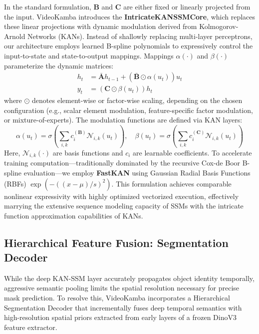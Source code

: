 In the standard formulation, $\mathbf{B}$ and $\mathbf{C}$ are either fixed or linearly projected from the input. VideoKamba introduces the \textbf{IntricateKANSSMCore}, which replaces these linear projections with dynamic modulation derived from Kolmogorov-Arnold Networks (KANs). Instead of shallowly replacing multi-layer perceptrons, our architecture employs learned B-spline polynomials to expressively control the input-to-state and state-to-output mappings. Mappings $\alpha(\cdot)$ and $\beta(\cdot)$ parameterize the dynamic matrices:
\begin{align}
    h_t &= \bar{\mathbf{A}}h_{t-1} + (\bar{\mathbf{B}} \odot \alpha(u_t))u_t \\
    y_t &= (\mathbf{C} \odot \beta(u_t))h_t
\end{align}
where $\odot$ denotes element-wise or factor-wise scaling, depending on the chosen configuration (e.g., scalar element modulation, feature-specific factor modulation, or mixture-of-experts). The modulation functions are defined via KAN layers:
\begin{equation}
    \alpha(u_t) = \sigma\left(\sum_{i,k} c_i^{(\mathbf{B})} \mathcal{N}_{i,k}(u_t)\right), \quad \beta(u_t) = \sigma\left(\sum_{i,k} c_i^{(\mathbf{C})} \mathcal{N}_{i,k}(u_t)\right)
\end{equation}
Here, $\mathcal{N}_{i,k}(\cdot)$ are basis functions and $c_i$ are learnable coefficients. To accelerate training computation---traditionally dominated by the recursive Cox-de Boor B-spline evaluation---we employ \textbf{FastKAN} using Gaussian Radial Basis Functions (RBFs) $\exp(-((x-\mu)/s)^2)$. This formulation achieves comparable nonlinear expressivity with highly optimized vectorized execution, effectively marrying the extensive sequence modeling capacity of SSMs with the intricate function approximation capabilities of KANs.

\subsection{Hierarchical Feature Fusion: Segmentation Decoder}
\label{sec:seg_decoder}
While the deep KAN-SSM layer accurately propagates object identity temporally, aggressive semantic pooling limits the spatial resolution necessary for precise mask prediction. To resolve this, VideoKamba incorporates a Hierarchical Segmentation Decoder that incrementally fuses deep temporal semantics with high-resolution spatial priors extracted from early layers of a frozen DinoV3 feature extractor.

